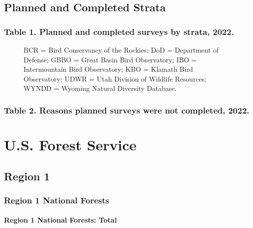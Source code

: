 \documentclass[
  letterpaper,
  DIV=11,
  numbers=noendperiod,
  oneside]{scrreprt}
\begin{document}
\hypertarget{planned-and-completed-strata}{%
\section*{Planned and Completed
Strata}\label{planned-and-completed-strata}}


\hypertarget{sec-planned-completed}{%
\subsection{Table 1. Planned and completed surveys by strata,
2022.}\label{sec-planned-completed}}

\begin{figure}

BCR = Bird Conservancy of the Rockies; DoD = Department of Defense; GBBO
= Great Basin Bird Observatory; IBO = Intermountain Bird Observatory;
KBO = Klamath Bird Observatory; UDWR = Utah Division of Wildlife
Resources; WYNDD = Wyoming Natural Diversity Database.

\end{figure}

\hypertarget{sec-reasons}{%
\subsection{Table 2. Reasons planned surveys were not completed,
2022.}\label{sec-reasons}}

\hypertarget{u.s.-forest-service}{%
\chapter{U.S. Forest Service}\label{u.s.-forest-service}}

\hypertarget{region-1}{%
\section{Region 1}\label{region-1}}

\hypertarget{region-1-national-forests}{%
\subsection{Region 1 National Forests}\label{region-1-national-forests}}

\hypertarget{region-1-national-forests-total}{%
\subsubsection{Region 1 National Forests:
Total}\label{region-1-national-forests-total}}
\end{document}
